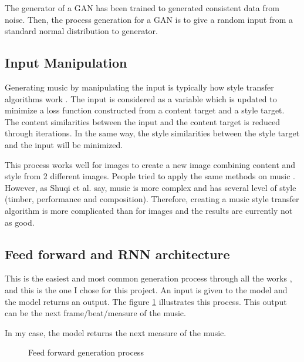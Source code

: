 \documentclass[12pt]{report}
\begin{document}
The generator of a GAN has been trained to generated consistent data from noise.
Then, the process generation for a GAN is to give a random input from a standard normal distribution to generator.

\subsection{Input Manipulation}

Generating music by manipulating the input is typically how style transfer algorithms work \cite{shetty_neural_2019, gatys_neural_2015, li_universal_2017}.
The input is considered as a variable which is updated to minimize a loss function constructed from a content target and a style target.
The content similarities between the input and the content target is reduced through iterations.
In the same way, the style similarities between the style target and the input will be minimized.

This process works well for images to create a new image combining content and style from 2 different images.
People tried to apply the same methods on music \cite{kaliakatsos-papakostas_conceptual_2017, hung_musical_2019, brunner_symbolic_2018, lu_play_2018}.
However, as Shuqi et al. \cite{dai_music_2018} say, music is more complex and has several level of style (timber, performance and composition).
Therefore, creating a music style transfer algorithm is more complicated than for images and the results are currently not as good.

\subsection{Feed forward and RNN architecture}
\label{sec:rw:feed-forward}

This is the easiest and most common generation process through all the works \cite{liang_automatic_2017, chuan_modeling_nodate, huang_counterpoint_2017, wu_hierarchical_2018}, and this is the one I chose for this project.
An input is given to the model and the model returns an output.
The figure \ref{fig:feed_forward_generation_process} illustrates this process.
This output can be the next frame/beat/measure of the music.

In my case, the model returns the next measure of the music.

\begin{figure}[h]
\begin{center}
\caption{Feed forward generation process}
\label{fig:feed_forward_generation_process}
\end{center}
\end{figure}
\end{document}
